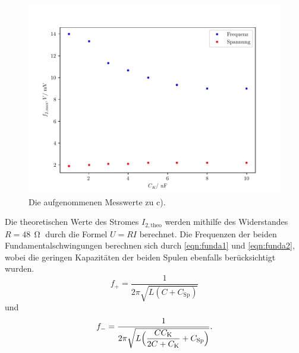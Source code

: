 \begin{figure}[H]
  \centering
  \includegraphics{freq2.pdf}
  \caption{Die aufgenommenen Messwerte zu c).}
  \label{fig:freq2}
\end{figure}

\noindent Die theoretischen Werte des Stromes $I_{2,\text{theo}}$ werden mithilfe des Widerstandes $R= 48 \,\upOmega$ durch die Formel $U=RI$ berechnet. 
Die Frequenzen der beiden Fundamentalschwingungen berechnen sich durch \autoref{eqn:funda1} und \autoref{eqn:funda2}, wobei die geringen Kapazitäten 
der beiden Spulen ebenfalls berücksichtigt wurden.
\begin{equation}
  \label{eqn:funda1}
  f_+ = \frac{1}{2\pi\sqrt{L(C + C_\text{Sp})}}
\end{equation} 
und \newline
\begin{equation}
  \label{eqn:funda2}
  f_- = \frac{1}{2\pi\sqrt{L\Bigl(\dfrac{CC_\text{K}}{2C+C_\text{K}} + C_\text{Sp}\Bigr)}}.
\end{equation}


